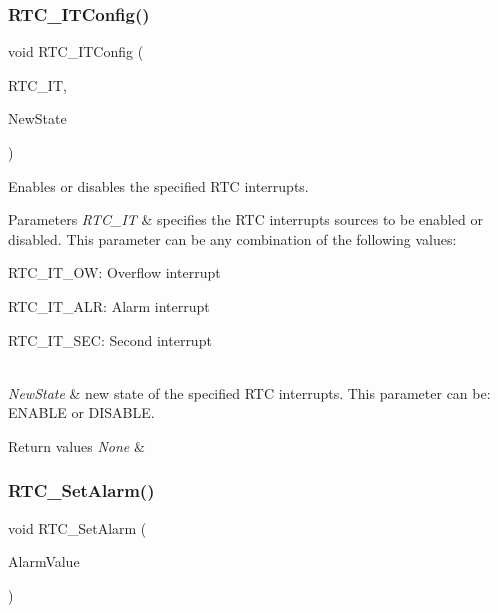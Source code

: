 \subsubsection{\texorpdfstring{RTC\_ITConfig()}{RTC\_ITConfig()}}
{\footnotesize\ttfamily void R\+T\+C\+\_\+\+I\+T\+Config (\begin{DoxyParamCaption}\item[{uint16\+\_\+t}]{R\+T\+C\+\_\+\+IT,  }\item[{\mbox{\hyperlink{group___exported__types_gac9a7e9a35d2513ec15c3b537aaa4fba1}{Functional\+State}}}]{New\+State }\end{DoxyParamCaption})}



Enables or disables the specified R\+TC interrupts. 


\begin{DoxyParams}{Parameters}
{\em R\+T\+C\+\_\+\+IT} & specifies the R\+TC interrupts sources to be enabled or disabled. This parameter can be any combination of the following values\+: \begin{DoxyItemize}
\item R\+T\+C\+\_\+\+I\+T\+\_\+\+OW\+: Overflow interrupt \item R\+T\+C\+\_\+\+I\+T\+\_\+\+A\+LR\+: Alarm interrupt \item R\+T\+C\+\_\+\+I\+T\+\_\+\+S\+EC\+: Second interrupt \end{DoxyItemize}
\\
\hline
{\em New\+State} & new state of the specified R\+TC interrupts. This parameter can be\+: E\+N\+A\+B\+LE or D\+I\+S\+A\+B\+LE. \\
\hline
\end{DoxyParams}

\begin{DoxyRetVals}{Return values}
{\em None} & \\
\hline
\end{DoxyRetVals}
\mbox{\label{group___r_t_c___exported___functions_gaec644c636a30ab5e287ba60ffc77132c}} 
\subsubsection{\texorpdfstring{RTC\_SetAlarm()}{RTC\_SetAlarm()}}
{\footnotesize\ttfamily void R\+T\+C\+\_\+\+Set\+Alarm (\begin{DoxyParamCaption}\item[{uint32\+\_\+t}]{Alarm\+Value }\end{DoxyParamCaption})}



